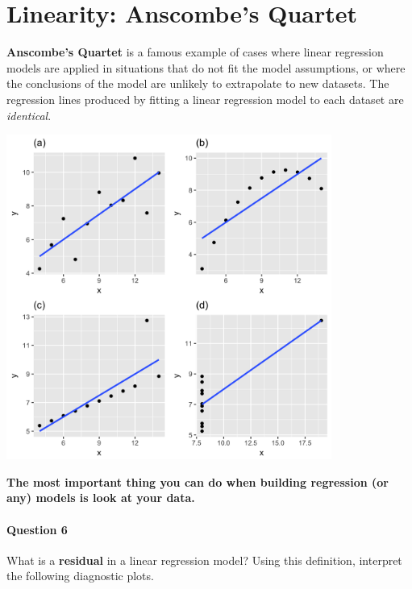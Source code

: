 \section{Linearity: Anscombe's Quartet}

\textbf{Anscombe's Quartet} is a famous example of cases where linear regression models are applied in situations that do not fit the model assumptions, or where the conclusions of the model are unlikely to extrapolate to new datasets. The regression lines produced by fitting a linear regression model to each dataset are \emph{identical}.  

\begin{center}
\includegraphics[width=0.8\textwidth]{img/anscombe.png}
\end{center}

\textbf{The most important thing you can do when building regression (or any) models is look at your data.}


\newpage

\paragraph{Question 6} What is a \textbf{residual} in a linear regression model? Using this definition, interpret the following diagnostic plots.

